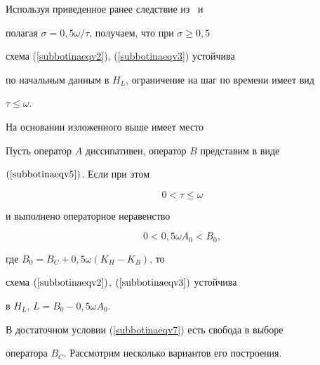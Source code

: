 Используя приведенное ранее следствие из~\cite{subbotinabib6} и 


полагая $\sigma =0{,}5\omega/\tau$, получаем, что при $\sigma \ge 0{,}5$


схема (\ref{subbotinaeqv2}), (\ref{subbotinaeqv3}) устойчива 


по начальным данным в $H_L$, ограничение на шаг по времени имеет вид


$\tau  \le \omega$.





На основании изложенного выше имеет место





\begin{thm} \label{subbotinateo1}


Пусть оператор $A$ диссипативен, оператор $B$ представим в виде


$(\ref{subbotinaeqv5})$. Если при этом


\begin{equation} \label{subbotinaeqv6}


0 < \tau  \le \omega


\end{equation}


и выполнено операторное неравенство


\begin{equation} \label{subbotinaeqv7}


0<0{,}5\omega A_0<B_0,


\end{equation}


где $B_0=B_C+0{,}5\omega \left({K_H - K_B} \right)$, то 


схема $(\ref{subbotinaeqv2})$, $(\ref{subbotinaeqv3})$ устойчива 


в $H_L$, $L=B_0 - 0{,}5 \omega A_0$.


\end{thm}





В достаточном условии (\ref{subbotinaeqv7}) есть свобода в выборе 


оператора $B_C$. Рассмотрим несколько вариантов его построения.





